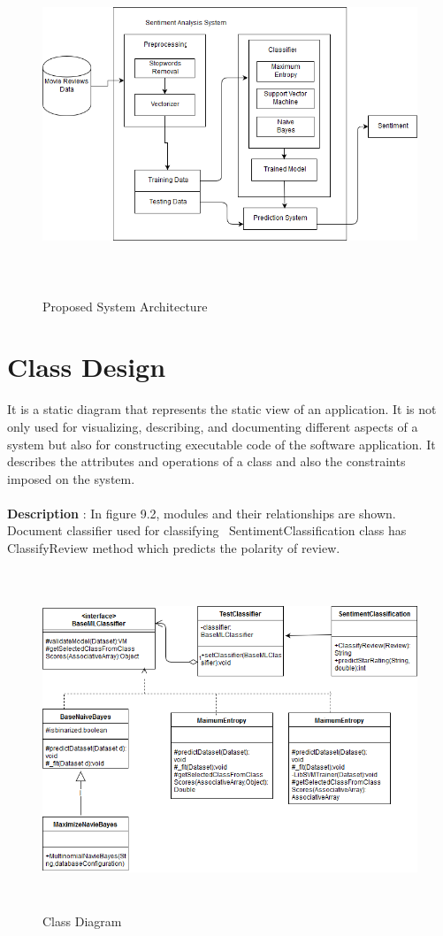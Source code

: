 \documentclass[oneside,a4paper,12pt]{pictreport}
\begin{document}
\begin{figure}[!h]
\includegraphics[width=5.7in,height=4.0in]{archi.png}
\caption{Proposed System Architecture}
\end{figure}

\section{Class Design}
It is a static diagram that represents the static view of an application. It is not only used for visualizing, describing, and documenting different aspects of a system but also for constructing executable code of the software application. It describes the attributes and operations of a class and also the constraints imposed on the system.\\\\
\textbf{Description} : In figure 9.2, modules and their relationships are shown. Document classifier used for classifying \
SentimentClassification class has ClassifyReview method which predicts the polarity of review.

\begin{figure}[h!]
\includegraphics[width=4.5in,height=4.0in]{class.png}
\caption{Class Diagram}
\end{figure}
\newpage
\end{document}
